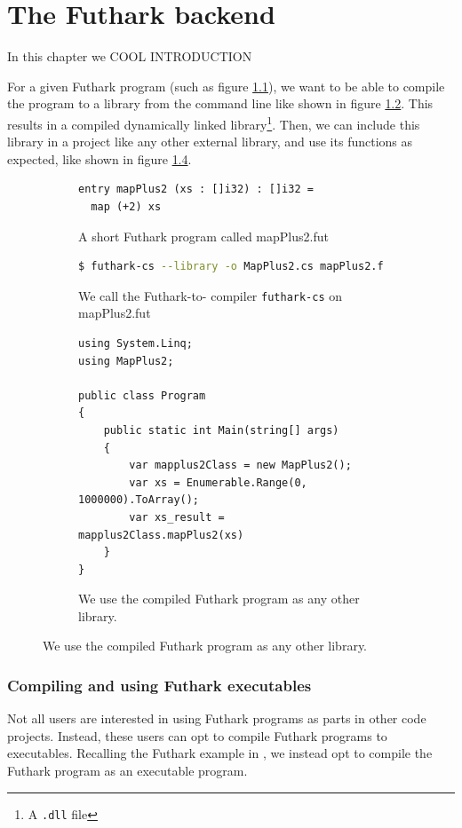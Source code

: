 \chapter{The Futhark \csharp{} backend}
In this chapter we 
COOL INTRODUCTION

For a given Futhark program (such as figure \ref{fig:shortfutharkprogram3'}), we want to be able to compile the program to a
\csharp{} library from the command line like shown in figure \ref{fig:shortfutharkprogram4'}.
This results in a compiled \csharp{} dynamically linked library\footnote{A
  \texttt{.dll} file}.
Then, we can include this library in a \csharp{} project like any other external
library, and use its functions as expected, like shown in figure \ref{fig:shortfutharkprogram5'}.

\begin{figure}[H]
\begin{subfigure}
  \centering
  \begin{lstlisting}[language=Futhark]
entry mapPlus2 (xs : []i32) : []i32 =
  map (+2) xs
  \end{lstlisting}
  \caption{A short Futhark program called mapPlus2.fut}
  \label{fig:shortfutharkprogram3'}
\end{subfigure}

\begin{subfigure}
  \centering
  \begin{lstlisting}[language=sh]
$ futhark-cs --library -o MapPlus2.cs mapPlus2.fut
  \end{lstlisting}
  \caption{We call the Futhark-to-\csharp{} compiler \texttt{futhark-cs} on
    mapPlus2.fut}
  \label{fig:shortfutharkprogram4'}
\end{subfigure}

\begin{subfigure}
  \centering
\begin{verbatim}
using System.Linq;
using MapPlus2;

public class Program
{
    public static int Main(string[] args)
    {
        var mapplus2Class = new MapPlus2();
        var xs = Enumerable.Range(0, 1000000).ToArray();
        var xs_result = mapplus2Class.mapPlus2(xs)
    }
}
\end{verbatim}
  \caption{We use the compiled Futhark program as any other library.}
  \label{fig:shortfutharkprogram5'}
\end{subfigure}
\end{figure}

\subsection{Compiling and using Futhark \csharp{} executables}
Not all users are interested in using Futhark programs as parts in other code
projects. Instead, these users can opt to compile Futhark programs to
executables. Recalling the Futhark example in
,
we instead opt to compile the Futhark program as an executable program.

